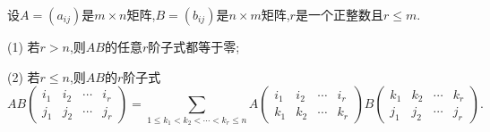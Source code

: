 \documentclass[lang=cn,newtx,10pt,scheme=chinese]{elegantbook}
\begin{document}
    \begin{corollary}\label{corollary:Cauchy-Binet公式推论}
        设\(A=(a_{ij})\)是\(m\times n\)矩阵,\(B=(b_{ij})\)是\(n\times m\)矩阵,\(r\)是一个正整数且\(r\leq m\).
    
    (1) 若\(r > n\),则\(AB\)的任意\(r\)阶子式都等于零;
    
    (2) 若\(r\leq n\),则\(AB\)的\(r\)阶子式
    \[AB\left(\begin{matrix}
    i_1 & i_2 & \cdots & i_r\\
    j_1 & j_2 & \cdots & j_r
    \end{matrix}\right)=\sum_{1\leq k_1<k_2<\cdots<k_r\leq n}A\left(\begin{matrix}
    i_1 & i_2 & \cdots & i_r\\
    k_1 & k_2 & \cdots & k_r
    \end{matrix}\right)B\left(\begin{matrix}
    k_1 & k_2 & \cdots & k_r\\
    j_1 & j_2 & \cdots & j_r
    \end{matrix}\right).\]
\end{corollary}
\end{document}
